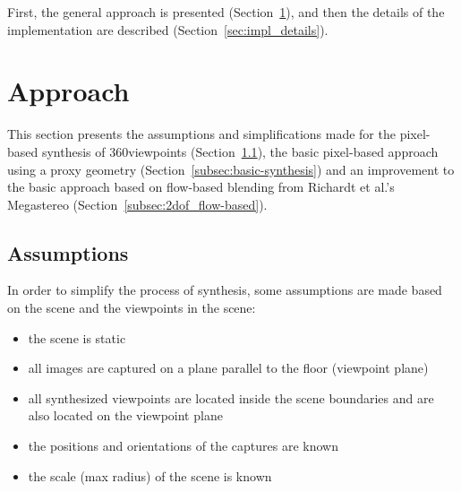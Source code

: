 First, the general approach is presented (Section~\ref{sec:approach}), and then the details of the implementation are described (Section~\ref{sec:impl_details}).


\section{Approach} \label{sec:approach}
This section presents the assumptions and simplifications made for the pixel-based synthesis of 360\degree viewpoints (Section~\ref{subsec:assumptions}), the basic pixel-based approach using a proxy geometry (Section~\ref{subsec:basic-synthesis}) and an improvement to the basic approach based on flow-based blending from Richardt et al.'s Megastereo \cite{megastereo} (Section~\ref{subsec:2dof_flow-based}).

\subsection{Assumptions}\label{subsec:assumptions}
In order to simplify the process of synthesis, some assumptions are made based on the scene and the viewpoints in the scene:

\begin{itemize}
  \item the scene is static
  \item all images are captured on a plane parallel to the floor (viewpoint plane)
  \item all synthesized viewpoints are located inside the scene boundaries and are also located on the viewpoint plane
  \item the positions and orientations of the captures are known
  \item the scale (max radius) of the scene is known
\end{itemize}

